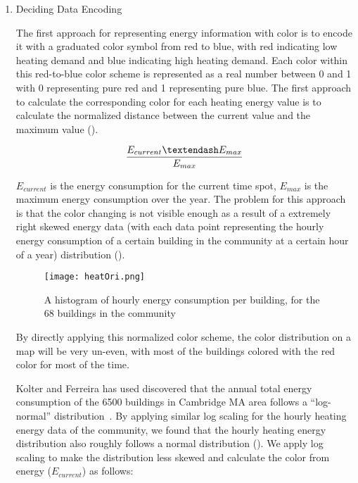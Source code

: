 \begin{enumerate}[1)]
\item{Deciding Data Encoding}

  The first approach for representing energy information with color is
  to encode it with a graduated color symbol from red to blue, with
  red indicating low heating demand and blue indicating high heating
  demand. Each color within this red-to-blue color scheme is
  represented as a real number between 0 and 1 with 0 representing
  pure red and 1 representing pure blue. The first approach to
  calculate the corresponding color for each heating energy value is
  to calculate the normalized distance between the current value and
  the maximum value ().

  \begin{equation}\label{eq:linear} 
    {E_{current} – E_{max} \over E_{max}}
  \end{equation}

  $E_{current}$ is the energy consumption for the current time spot,
  $E_{max}$ is the maximum energy consumption over the year. The
  problem for this approach is that the color changing is not visible
  enough as a result of a extremely right skewed energy data (with
  each data point representing the hourly energy consumption of a
  certain building in the community at a certain hour of a year)
  distribution ().

  \begin{figure}[h!]
    \centering
    \texttt{[image: heatOri.png]}
    \caption[Heating Demand Histogram of Conceptual City]{A histogram
      of hourly energy consumption per building, for the 68 buildings
      in the community}
    \label{fig:heatOri}
  \end{figure}

  By directly applying this normalized color scheme, the color
  distribution on a map will be very un-even, with most of the
  buildings colored with the red color for most of the time.

  Kolter and Ferreira has used discovered that the annual total energy
  consumption of the 6500 buildings in Cambridge MA area follows a
  ``log-normal'' distribution~\cite{Zico2011}. By applying similar log
  scaling for the hourly heating energy data of the community, we
  found that the hourly heating energy distribution also roughly
  follows a normal distribution (). We apply log
  scaling to make the distribution less skewed and calculate the color
  from energy ($E_{current}$) as follows:


\end{enumerate}
